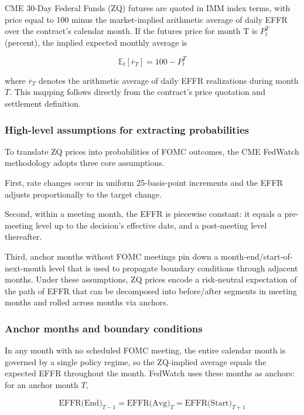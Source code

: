 CME 30-Day Federal Funds (ZQ) futures are quoted in IMM index terms, with price equal to 100 minus the market-implied arithmetic average of daily EFFR over the contract’s calendar month. If the futures price for month T is $P_t^T$ (percent), the implied expected monthly average is

$$\mathbb{E}_t[\overline{r}_T] = 100 - P_t^T$$

where $\overline{r}_T$ denotes the arithmetic average of daily EFFR realizations during month $T$. This mapping follows directly from the contract’s price quotation and settlement definition.


\subsubsection{High-level assumptions for extracting probabilities}

To translate ZQ prices into probabilities of FOMC outcomes, the CME FedWatch methodology adopts three core assumptions.

First, rate changes occur in uniform 25-basis-point increments and the EFFR adjusts proportionally to the target change.

Second, within a meeting month, the EFFR is piecewise constant: it equals a pre-meeting level up to the decision’s effective date, and a post-meeting level thereafter.

Third, anchor months without FOMC meetings pin down a month-end/start-of-next-month level that is used to propagate boundary conditions through adjacent months. Under these assumptions, ZQ prices encode a risk-neutral expectation of the path of EFFR that can be decomposed into before/after segments in meeting months and rolled across months via anchors.

\subsubsection{Anchor months and boundary conditions}

In any month with no scheduled FOMC meeting, the entire calendar month is governed by a single policy regime, so the ZQ-implied average equals the expected EFFR throughout the month. FedWatch uses these months as anchors: for an anchor month $T$,

$$\text{EFFR(End)}_{T-1}=\text{EFFR(Avg)}_{T}=\text{EFFR(Start)}_{T+1}$$

